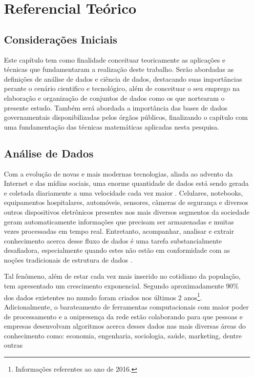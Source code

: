 \chapter{Referencial Teórico}\label{cap:referencias}

\section{Considerações Iniciais}

Este capítulo tem como finalidade conceituar teoricamente as aplicações e técnicas que fundamentaram a realização deste trabalho. Serão abordadas as definições de análise de dados e ciência de dados, destacando suas importâncias perante o cenário cientifico e tecnológico, além de conceituar o seu emprego na elaboração e organização de conjuntos de dados como os que nortearam o presente estudo. Também será abordada a importância das bases de dados governamentais disponibilizadas pelos órgãos públicos, finalizando o capítulo com uma fundamentação das técnicas matemáticas aplicadas nesta pesquisa.

\section{Análise de Dados}

Com a evolução de novas e mais modernas tecnologias, aliada ao advento da Internet e das mídias sociais, uma enorme quantidade de dados está sendo gerada e coletada diariamente a uma velocidade cada vez maior \cite{cap02_ref7, cap02_ref10}. Celulares, notebooks, equipamentos hospitalares, automóveis, sensores, câmeras de segurança e diversos outros dispositivos eletrônicos presentes nos mais diversos segmentos da sociedade geram automaticamente informações que precisam ser armazenadas e muitas vezes processadas em tempo real. Entretanto, acompanhar, analisar e extrair conhecimento acerca desse fluxo de dados é uma tarefa substancialmente desafiadora, especialmente quando estes não estão em conformidade com as noções tradicionais de estrutura de dados \cite{cap02_ref3}.

Tal fenômeno, além de estar cada vez mais inserido no cotidiano da população, tem apresentado um crescimento exponencial. Segundo \cite{cap02_ref4} aproximadamente 90\% dos dados existentes no mundo foram criados nos últimos 2 anos\footnote{Informações referentes ao ano de 2016.}. Adicionalmente, o barateamento de ferramentas computacionais com maior poder de processamento e a onipresença da rede estão colaborando para que pessoas e empresas desenvolvam algoritmos acerca desses dados nas mais diversas áreas do conhecimento como: economia, engenharia, sociologia, saúde, marketing, dentre outras \cite{cap02_ref9, cap02_ref5}

